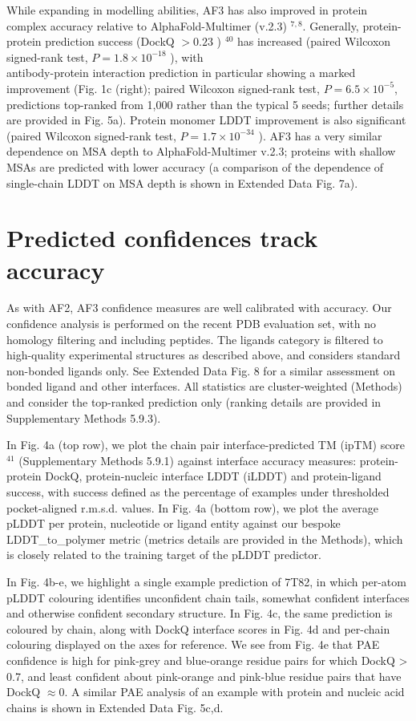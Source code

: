 \documentclass[10pt]{article}
\begin{document}
While expanding in modelling abilities, AF3 has also improved in protein complex accuracy relative to AlphaFold-Multimer (v.2.3) ${ }^{7,8}$. Generally, protein-protein prediction success (DockQ $>0.23$ ) ${ }^{40}$ has increased (paired Wilcoxon signed-rank test, $P=1.8 \times 10^{-18}$ ), with\\
antibody-protein interaction prediction in particular showing a marked improvement (Fig. 1c (right); paired Wilcoxon signed-rank test, $P=6.5 \times 10^{-5}$, predictions top-ranked from 1,000 rather than the typical 5 seeds; further details are provided in Fig. 5a). Protein monomer LDDT improvement is also significant (paired Wilcoxon signed-rank test, $P=1.7 \times 10^{-34}$ ). AF3 has a very similar dependence on MSA depth to AlphaFold-Multimer v.2.3; proteins with shallow MSAs are predicted with lower accuracy (a comparison of the dependence of single-chain LDDT on MSA depth is shown in Extended Data Fig. 7a).

\section*{Predicted confidences track accuracy}
As with AF2, AF3 confidence measures are well calibrated with accuracy. Our confidence analysis is performed on the recent PDB evaluation set, with no homology filtering and including peptides. The ligands category is filtered to high-quality experimental structures as described above, and considers standard non-bonded ligands only. See Extended Data Fig. 8 for a similar assessment on bonded ligand and other interfaces. All statistics are cluster-weighted (Methods) and consider the top-ranked prediction only (ranking details are provided in Supplementary Methods 5.9.3).

In Fig. 4a (top row), we plot the chain pair interface-predicted TM (ipTM) score ${ }^{41}$ (Supplementary Methods 5.9.1) against interface accuracy measures: protein-protein DockQ, protein-nucleic interface LDDT (iLDDT) and protein-ligand success, with success defined as the percentage of examples under thresholded pocket-aligned r.m.s.d. values. In Fig. 4a (bottom row), we plot the average pLDDT per protein, nucleotide or ligand entity against our bespoke LDDT\_to\_polymer metric (metrics details are provided in the Methods), which is closely related to the training target of the pLDDT predictor.

In Fig. 4b-e, we highlight a single example prediction of 7T82, in which per-atom pLDDT colouring identifies unconfident chain tails, somewhat confident interfaces and otherwise confident secondary structure. In Fig. 4c, the same prediction is coloured by chain, along with DockQ interface scores in Fig. 4d and per-chain colouring displayed on the axes for reference. We see from Fig. 4e that PAE confidence is high for pink-grey and blue-orange residue pairs for which DockQ > 0.7, and least confident about pink-orange and pink-blue residue pairs that have DockQ $\approx 0$. A similar PAE analysis of an example with protein and nucleic acid chains is shown in Extended Data Fig. 5c,d.
\end{document}
